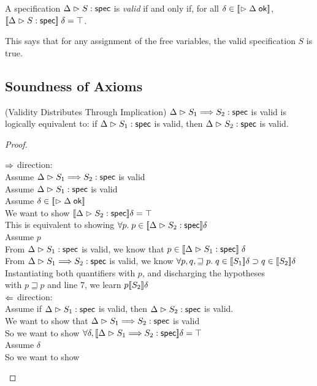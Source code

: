 A specification ${\Delta} \vartriangleright {S} : \mathsf{spec}$ is \emph{valid} if and only if, for all
$\delta \in [\![{\vartriangleright {\Delta} \;\mathsf{ok}}]\!]$, $[\![{{\Delta} \vartriangleright {S} : \mathsf{spec}}]\!]\;\delta = \top$. 

This says that for any assignment of the free variables, the valid
specification $S$ is true.

\subsection{Soundness of Axioms}

\begin{lemma}{(Validity Distributes Through Implication)}
${\Delta} \vartriangleright {S_1 \Longrightarrow S_2} : \mathsf{spec}$ is valid is logically equivalent to: if
${\Delta} \vartriangleright {S_1} : \mathsf{spec}$ is valid, then ${\Delta} \vartriangleright {S_2} : \mathsf{spec}$ is valid.
\end{lemma}

\begin{proof}
  \begin{tabbedproof}
    \oo $\Rightarrow$ direction: \\
    \ooo Assume ${\Delta} \vartriangleright {S_1 \Longrightarrow S_2} : \mathsf{spec}$ is valid \\
    \ooo Assume ${\Delta} \vartriangleright {S_1} : \mathsf{spec}$ is valid \\
    \ooo Assume $\delta \in [\![{\vartriangleright {\Delta} \;\mathsf{ok}}]\!]$ \\
    \oooo We want to show $[\![{{\Delta} \vartriangleright {S_2} : \mathsf{spec}}]\!]\delta = \top$ \\
    \oooo This is equivalent to showing $\forall p.\; p \in [\![{{\Delta} \vartriangleright {S_2} : \mathsf{spec}}]\!]\delta$ \\
    \oooo Assume $p$ \\ 
    \ooooo From ${\Delta} \vartriangleright {S_1} : \mathsf{spec}$ is valid, we know that $p \in [\![{{\Delta} \vartriangleright {S_1} : \mathsf{spec}}]\!]\;\delta$ \\
    \ooooo From ${\Delta} \vartriangleright {S_1 \Longrightarrow S_2} : \mathsf{spec}$ is valid, we know 
          $\forall p, q, \sqsupseteq p.\; q \in [\![{S_1}]\!]\delta \supset q \in [\![{S_2}]\!]\delta$ \\
    \ooooo Instantiating both quantifiers with $p$, and discharging the hypotheses \\
    \ooooo with $p \sqsupseteq p$ and line 7, we learn $p [\![{S_2}]\!]\delta$\\
    \oo $\Leftarrow$ direction: \\
    \ooo Assume if ${\Delta} \vartriangleright {S_1} : \mathsf{spec}$ is valid, then ${\Delta} \vartriangleright {S_2} : \mathsf{spec}$ is valid. \\
    \oooo We want to show that ${\Delta} \vartriangleright {S_1 \Longrightarrow S_2} : \mathsf{spec}$ is valid\\
    \oooo So we want to show $\forall \delta, [\![{{\Delta} \vartriangleright {S_1 \Longrightarrow S_2} : \mathsf{spec}}]\!]\delta = \top$ \\
    \oooo Assume $\delta$ \\
    \ooooo So we want to show 
  \end{tabbedproof}
\end{proof}



